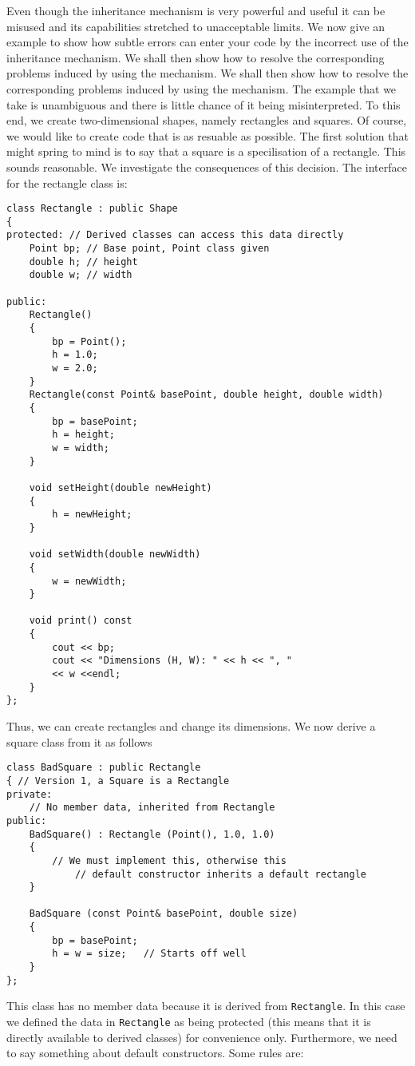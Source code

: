 Even though the inheritance mechanism is very powerful and useful it can be misused and its capabilities stretched to unacceptable limits. We now give an example to show how subtle errors can enter your code by the incorrect use of the inheritance mechanism. We shall then show how to resolve the corresponding problems induced by using the mechanism. We shall then show how to resolve the corresponding problems induced by using the mechanism. The example that we take is unambiguous and there is little chance of it being misinterpreted. To this end, we create two-dimensional shapes, namely rectangles and squares. Of course, we would like to create code that is as resuable as possible. The first solution that might spring to mind is to say that a square is a specilisation of a rectangle. This sounds reasonable. We investigate the consequences of this decision. The interface for the rectangle class is:
\begin{lstlisting}
class Rectangle : public Shape
{
protected: // Derived classes can access this data directly
	Point bp; // Base point, Point class given
	double h; // height
	double w; // width

public:
	Rectangle()
	{
		bp = Point();
		h = 1.0;
		w = 2.0;
	}
	Rectangle(const Point& basePoint, double height, double width)
	{
		bp = basePoint;
		h = height;
		w = width;
	}

	void setHeight(double newHeight)
	{
		h = newHeight;
	}

	void setWidth(double newWidth)
	{
		w = newWidth;
	}

	void print() const
	{
		cout << bp;
		cout << "Dimensions (H, W): " << h << ", "
		<< w <<endl;
	}
};
\end{lstlisting}
Thus, we can create rectangles and change its dimensions. We now derive a square class from it as follows
\begin{lstlisting}
class BadSquare : public Rectangle
{ // Version 1, a Square is a Rectangle
private:
	// No member data, inherited from Rectangle
public:
	BadSquare() : Rectangle (Point(), 1.0, 1.0)
	{
		// We must implement this, otherwise this
			// default constructor inherits a default rectangle
	}

	BadSquare (const Point& basePoint, double size)
	{
		bp = basePoint;
		h = w = size;	// Starts off well
	}
};
\end{lstlisting}
This class has no member data because it is derived from \texttt{Rectangle}. In this case we defined the data in \texttt{Rectangle} as being protected (this means that it is directly available to derived classes) for convenience only. Furthermore, we need to say something about default constructors. Some rules are:
